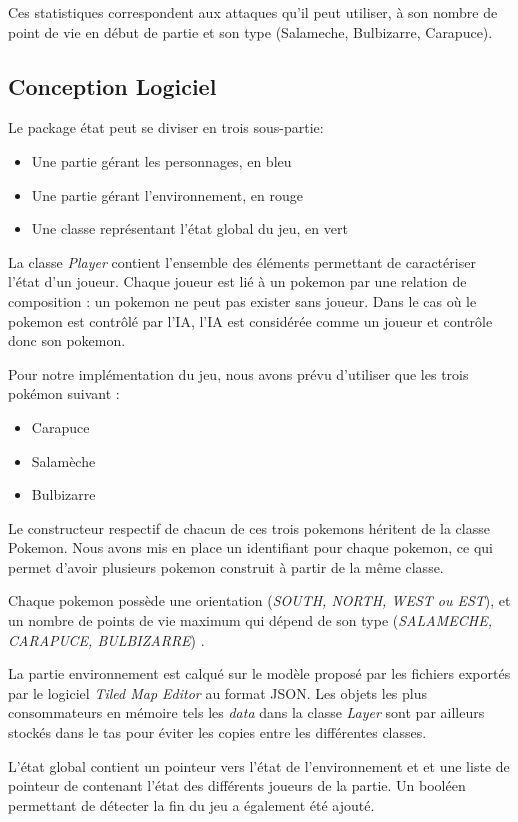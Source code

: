 \documentclass[a4paper,12pt]{article}
\begin{document}
    
    Ces statistiques correspondent aux attaques qu'il peut utiliser, à son nombre de point de vie en début de partie et son type (Salameche, Bulbizarre, Carapuce).
    \subsection{Conception Logiciel}
    Le package état peut se diviser en trois sous-partie:\begin{itemize}
        \item Une partie gérant les personnages, en bleu
        \item Une partie gérant l'environnement, en rouge
        \item Une classe représentant l'état global du jeu, en vert
    \end{itemize}
    
     La classe \emph{Player} contient l'ensemble des éléments permettant de caractériser l'état d'un joueur. Chaque joueur est lié à un pokemon par une relation de composition : un pokemon ne peut pas exister sans joueur. Dans le cas où le pokemon est contrôlé par l'IA, l'IA est considérée comme un joueur et contrôle donc son pokemon.
     
    Pour notre implémentation du jeu, nous avons prévu d'utiliser que les trois pokémon suivant : \begin{itemize}
        \item Carapuce
        \item Salamèche
        \item Bulbizarre
    \end{itemize}
    Le constructeur respectif de chacun de ces trois pokemons héritent de la classe Pokemon. Nous avons mis en place un identifiant pour chaque pokemon, ce qui permet d'avoir plusieurs pokemon construit à partir de la même classe.
    
    Chaque pokemon possède une orientation (\emph{SOUTH, NORTH, WEST ou EST}), et un nombre de points de vie maximum qui dépend de son type (\emph{SALAMECHE, CARAPUCE, BULBIZARRE}) .
    
    La partie environnement est calqué sur le modèle proposé par les fichiers exportés par le logiciel \emph{Tiled Map Editor} au format JSON. Les objets les plus consommateurs en mémoire tels les \emph{data} dans la classe \emph{Layer} sont par ailleurs stockés dans le tas pour éviter les copies entre les différentes classes.
    
     L'état global contient un pointeur vers l'état de l'environnement et et une liste de pointeur de contenant l'état des différents joueurs de la partie. Un booléen permettant de détecter la fin du jeu a également été ajouté. 
     
\end{document}
